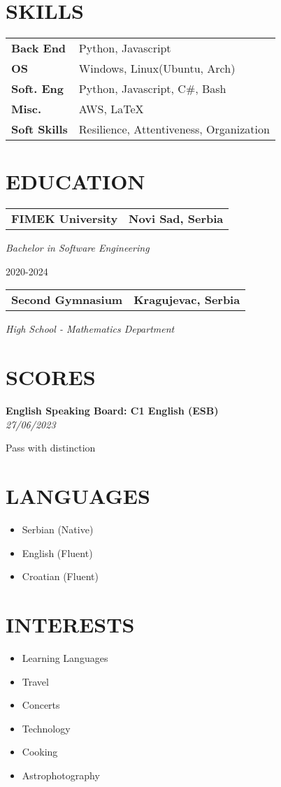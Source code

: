 \documentclass[11pt,a4paper]{moderncv}
\newcommand*{\educationentry}[4][0.5mm]{
    \begin{tabularx}{\textwidth}{LR}
        {\bfseries #3} & {\bfseries #4} \\
    \end{tabularx}
    {\itshape #2}
    \par\addvspace{#1}
}
\newcommand*{\scoreentry}[3][2.5mm]{
    {\bfseries #2} \\
    {\itshape #3}
    \par\addvspace{#1}
}
\begin{document}
\begin{minipage}[t]{0.35\textwidth}
    \section{SKILLS}
    \begin{tabularx}{\textwidth}{>{\bfseries}l@{\hskip 3.5mm}L}
        Back End    & Python, Javascript                      \\
        OS          & Windows, Linux(Ubuntu, Arch)            \\
        Soft. Eng   & Python, Javascript, C\#, Bash           \\
        Misc.       & AWS, \LaTeX                             \\
        Soft Skills & Resilience, Attentiveness, Organization
    \end{tabularx}

    \section{EDUCATION}
    \educationentry{Bachelor in Software Engineering}{FIMEK University}{Novi Sad, Serbia}
    2020-2024
    \par
    \vspace{3.0mm}
    \educationentry{High School - Mathematics Department}{Second Gymnasium}{Kragujevac, Serbia}

    \section{SCORES}
    \scoreentry{English Speaking Board: C1 English (ESB)}{27/06/2023}
    Pass with distinction


    \section{LANGUAGES}
    \begin{itemize}
        \item Serbian (Native)
        \item English (Fluent)
        \item Croatian (Fluent)
    \end{itemize}

    \section{INTERESTS}
    \begin{itemize}
        \item Learning Languages
        \item Travel
        \item Concerts
        \item Technology
        \item Cooking
        \item Astrophotography
    \end{itemize}
\end{minipage}
\end{document}
